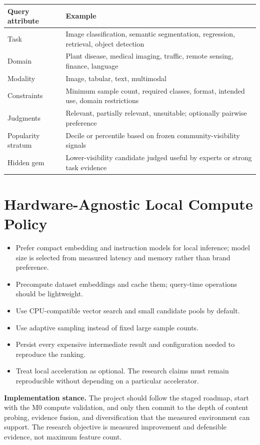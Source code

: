 \documentclass[11pt]{article}
\begin{document}
\begin{longtable}{@{}L{3.2cm}L{9.3cm}@{}}
\toprule
\textbf{Query attribute} & \textbf{Example} \\
\midrule
\endhead
Task & Image classification, semantic segmentation, regression, retrieval, object detection \\
Domain & Plant disease, medical imaging, traffic, remote sensing, finance, language \\
Modality & Image, tabular, text, multimodal \\
Constraints & Minimum sample count, required classes, format, intended use, domain restrictions \\
Judgments & Relevant, partially relevant, unsuitable; optionally pairwise preference \\
Popularity stratum & Decile or percentile based on frozen community-visibility signals \\
Hidden gem & Lower-visibility candidate judged useful by experts or strong task evidence \\
\bottomrule
\end{longtable}

\section{Hardware-Agnostic Local Compute Policy}
\begin{itemize}[leftmargin=*]
\item Prefer compact embedding and instruction models for local inference; model size is selected from
      measured latency and memory rather than brand preference.
\item Precompute dataset embeddings and cache them; query-time operations should be lightweight.
\item Use CPU-compatible vector search and small candidate pools by default.
\item Use adaptive sampling instead of fixed large sample counts.
\item Persist every expensive intermediate result and configuration needed to reproduce the ranking.
\item Treat local acceleration as optional. The research claims must remain reproducible without depending
      on a particular accelerator.
\end{itemize}

\textbf{Implementation stance.} The project should follow the staged roadmap, start with the M0 compute
validation, and only then commit to the depth of content probing, evidence fusion, and diversification that
the measured environment can support. The research objective is measured improvement and defensible
evidence, not maximum feature count.
\end{document}
